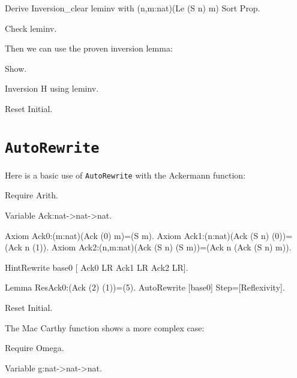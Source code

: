 \begin{coq_example*}
\begin{coq_example*}
Derive Inversion_clear leminv with (n,m:nat)(Le (S n) m) Sort Prop.
\end{coq_example*}

\begin{coq_example}
Check leminv.
\end{coq_example}

Then we can use the proven inversion lemma:

\begin{coq_example}
Show.
\end{coq_example}

\begin{coq_example}
Inversion H using leminv.
\end{coq_example}

\begin{coq_eval}
Reset Initial.
\end{coq_eval}

\section{\tt AutoRewrite}
\label{AutoRewrite-example}

\Example
Here is a basic use of {\tt AutoRewrite} with the Ackermann function:

\begin{coq_example*}
Require Arith.

Variable Ack:nat->nat->nat.

Axiom Ack0:(m:nat)(Ack (0) m)=(S m).
Axiom Ack1:(n:nat)(Ack (S n) (0))=(Ack n (1)).
Axiom Ack2:(n,m:nat)(Ack (S n) (S m))=(Ack n (Ack (S n) m)).
\end{coq_example*}

\begin{coq_example}
HintRewrite base0 [ Ack0 LR 
                Ack1 LR
                Ack2 LR].

Lemma ResAck0:(Ack (2) (1))=(5).
AutoRewrite [base0] Step=[Reflexivity].
\end{coq_example}

\begin{coq_eval}
Reset Initial.  
\end{coq_eval}

\Example
The Mac Carthy function shows a more complex case:

\begin{coq_example*}
Require Omega.

Variable g:nat->nat->nat.


\end{coq_example*}
\end{coq_example*}
